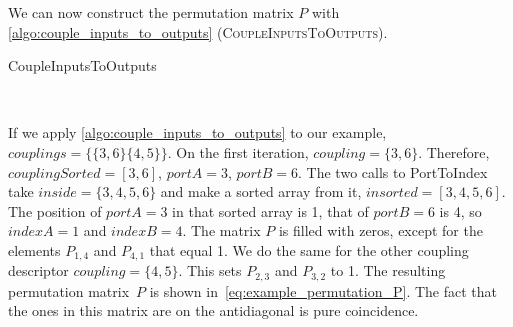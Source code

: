 We can now construct the permutation matrix $P$ with \cref{algo:couple_inputs_to_outputs} (\textsc{CoupleInputsToOutputs}).

\begin{algorithm}
    \caption{CoupleInputsToOutputs}
    \label{algo:couple_inputs_to_outputs}
    \begin{algorithmic}
         
         
        \EndFor
        \\ 
        \EndFunction
    \end{algorithmic}
\end{algorithm}

If we apply \cref{algo:couple_inputs_to_outputs} to our example,
$\textit{couplings}=\lbrace \lbrace 3,6 \rbrace \lbrace 4,5 \rbrace \rbrace$.
On the first iteration, $\textit{coupling}=\lbrace 3,6 \rbrace$.
Therefore, $\textit{couplingSorted}=[3,6]$, $\textit{portA}=3$, $\textit{portB}=6$.
The two calls to PortToIndex take $\textit{inside}=\lbrace 3, 4, 5, 6\rbrace$ and make a sorted array from it, $\textit{insorted}=[3, 4, 5, 6]$.
The position of $\textit{portA}=3$ in that sorted array is 1,
that of $\textit{portB}=6$ is 4,
so $\textit{indexA}=1$ and $\textit{indexB}=4$.
The matrix $P$ is filled with zeros, except for the elements $P_{1, 4}$ and $P_{4, 1}$ that equal 1.
We do the same for the other coupling descriptor $\textit{coupling}=\lbrace 4,5 \rbrace$.
This sets $P_{2, 3}$ and $P_{3, 2}$ to 1.
The resulting permutation matrix~$P$ is shown in~\cref{eq:example_permutation_P}.
The fact that the ones in this matrix are on the antidiagonal is pure coincidence.

